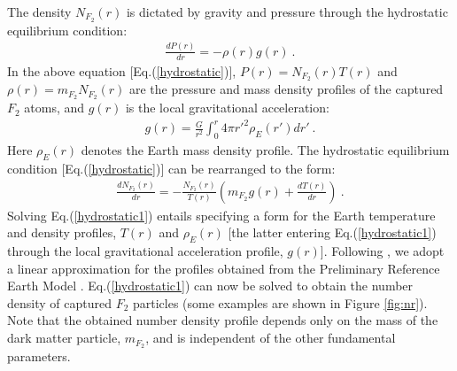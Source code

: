 \documentclass[12pt]{article}
\begin{document}
The density $N _{F_2}(r)$ is dictated by gravity and pressure through the hydrostatic equilibrium condition:
\begin{eqnarray}
\frac{dP(r)}{dr} = -\rho (r)g(r) \ .
\label{hydrostatic}
\end{eqnarray}
%
In the above equation [Eq.(\ref{hydrostatic})], $P(r) = N _{F_2}(r)T(r)$ and $\rho (r) = m _{F_2}N _{F_2}(r)$ are the pressure and mass density profiles of the captured $F_2$ atoms, and $g(r)$ is the local gravitational acceleration:
%
\begin{eqnarray}
g(r) = \frac{G}{r ^2}\int _0 ^r 4\pi {r'} ^2\rho _E (r') dr' \ .
\end{eqnarray}
%
Here $\rho _E(r)$ denotes the Earth mass density profile. The hydrostatic equilibrium condition [Eq.(\ref{hydrostatic})] can be rearranged to the form:
%
\begin{eqnarray}
\frac{dN _{F_2}(r)}{dr} = -\frac{N _{F_2}(r)}{T(r)}\left ( m _{F_2}g(r) + \frac{dT(r)}{dr} \right ) \ .
\label{hydrostatic1}
\end{eqnarray}
%
Solving Eq.(\ref{hydrostatic1}) entails specifying a form for the Earth temperature and density profiles, $T(r)$ and $\rho _E (r)$ [the latter entering Eq.(\ref{hydrostatic1}) through the local gravitational acceleration profile, $g(r)$]. Following \cite{footdiurnal}, we adopt a linear approximation for the profiles obtained from the Preliminary Reference Earth Model \cite{preliminary}. Eq.(\ref{hydrostatic1}) can now be solved to obtain the number density of captured $F_2$ particles (some examples are shown in Figure \ref{fig:nr}). Note that the obtained number density profile depends only on the mass of the dark matter particle, $m _{F_2}$, and is independent of the other fundamental parameters.
\end{document}
